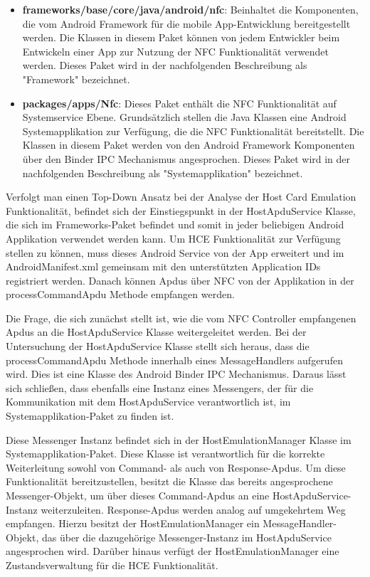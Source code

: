 \begin{itemize}
	\item \textbf{frameworks/base/core/java/android/nfc}: Beinhaltet die Komponenten, die vom Android Framework für die mobile App-Entwicklung bereitgestellt werden. Die Klassen in diesem Paket können von jedem Entwickler beim Entwickeln einer App zur Nutzung der NFC Funktionalität verwendet werden. Dieses Paket wird in der nachfolgenden Beschreibung als "Framework" bezeichnet.
	\item \textbf{packages/apps/Nfc}: Dieses Paket enthält die NFC Funktionalität auf Systemservice Ebene. Grundsätzlich stellen die Java Klassen eine Android Systemapplikation zur Verfügung, die die NFC Funktionalität bereitstellt. Die Klassen in diesem Paket werden von den Android Framework Komponenten über den Binder IPC Mechanismus angesprochen. Dieses Paket wird in der nachfolgenden Beschreibung als "Systemapplikation" bezeichnet.
\end{itemize}

Verfolgt man einen Top-Down Ansatz bei der Analyse der Host Card Emulation Funktionalität, befindet sich der Einstiegspunkt in der HostApduService Klasse, die sich im Frameworks-Paket befindet und somit in jeder beliebigen Android Applikation verwendet werden kann. Um HCE Funktionalität zur Verfügung stellen zu können, muss dieses Android Service von der App erweitert und im AndroidManifest.xml gemeinsam mit den unterstützten Application IDs registriert werden. Danach können Apdus über NFC von der Applikation in der processCommandApdu Methode empfangen werden. 

Die Frage, die sich zunächst stellt ist, wie die vom NFC Controller empfangenen Apdus an die HostApduService Klasse weitergeleitet werden. Bei der Untersuchung der HostApduService Klasse stellt sich heraus, dass die processCommandApdu Methode innerhalb eines MessageHandlers aufgerufen wird. Dies ist eine Klasse des Android Binder IPC Mechanismus. Daraus lässt sich schließen, dass ebenfalls eine Instanz eines Messengers, der für die Kommunikation mit dem HostApduService verantwortlich ist, im Systemapplikation-Paket zu finden ist. 

Diese Messenger Instanz befindet sich in der HostEmulationManager Klasse im Systemapplikation-Paket. Diese Klasse ist verantwortlich für die korrekte Weiterleitung sowohl von Command- als auch von Response-Apdus. Um diese Funktionalität bereitzustellen, besitzt die Klasse das bereits angesprochene Messenger-Objekt, um über dieses Command-Apdus an eine HostApduService-Instanz weiterzuleiten. Response-Apdus werden analog auf umgekehrtem Weg empfangen. Hierzu besitzt der HostEmulationManager ein MessageHandler-Objekt, das über die dazugehörige Messenger-Instanz im HostApduService angesprochen wird. Darüber hinaus verfügt der HostEmulationManager eine Zustandsverwaltung für die HCE Funktionalität. 

